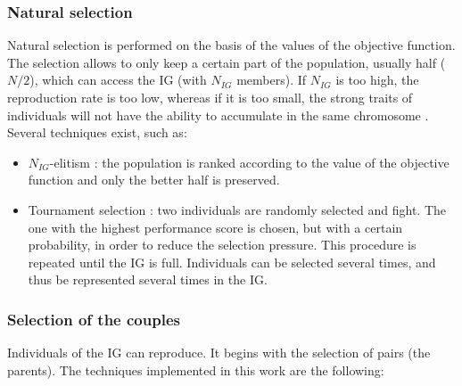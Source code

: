 \documentclass{ametsoc}
\begin{document}
\subsubsection{Natural selection}

Natural selection is performed on the basis of the values of the objective function. The selection allows to only keep a certain part of the population, usually half ($N/2$), which can access the IG (with $N_{IG}$ members). If $N_{IG}$ is too high, the reproduction rate is too low, whereas if it is too small, the strong traits of individuals will not have the ability to accumulate in the same chromosome \citep{Haupt2004}. Several techniques exist, such as:

\begin{itemize}
	\item $N_{IG}$-elitism \citep{Michalewicz1996}: the population is ranked according to the value of the objective function and only the better half is preserved. 
	
	\item Tournament selection \citep{Michalewicz1996, Zitzler2004a}: two individuals are randomly selected and fight. The one with the highest performance score is chosen, but with a certain probability, in order to reduce the selection pressure. This procedure is repeated until the IG is full. Individuals can be selected several times, and thus be represented several times in the IG.
\end{itemize}


\subsubsection{Selection of the couples}

Individuals of the IG can reproduce. It begins with the selection of pairs (the parents). The techniques implemented in this work are the following:
\end{document}
